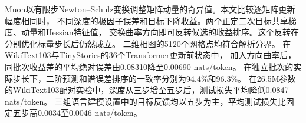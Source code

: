 Muon以有限步Newton--Schulz变换调整矩阵动量的奇异值。本文比较逐矩阵更新幅度相同时，
不同深度的极因子误差和目标下降收益。两个正定二次目标共享梯度、动量和Hessian特征值，
交换曲率方向即可反转候选的收益排序。这个反转在分别优化标量步长后仍然成立。
二维相图的5120个网格点均符合解析分界。
在WikiText103与TinyStories的36个Transformer更新前状态中，
加入方向曲率后，同批次收益差的平均绝对误差由0.08310降至0.00690 nats/token。
在独立批次的实际步长下，二阶预测和谱误差排序的一致率分别为94.4\%和96.3\%。
在26.5M参数的WikiText103配对实验中，深度从三步增至五步后，测试损失平均降低0.0847 nats/token。
三组语言建模设置中的目标反馈均以五步为主，平均测试损失比固定五步高0.0034至0.0046 nats/token。
